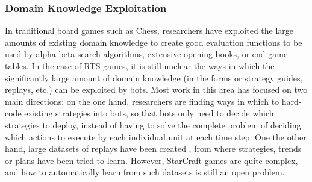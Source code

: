 \documentclass[journal]{IEEEtran}
\begin{document}
\subsubsection{Domain Knowledge Exploitation}
In traditional board games such as Chess, researchers have exploited the large amounts of existing domain knowledge to create good evaluation functions to be used by alpha-beta search algorithms, extensive opening books, or end-game tables. In the case of RTS games, it is still unclear the ways in which the significantly large amount of domain knowledge (in the forms or strategy guides, replays, etc.) can be exploited by bots. Most work in this area has focused on two main directions: on the one hand, researchers are finding ways in which to hard-code existing strategies into bots, so that bots only need to decide which strategies to deploy, instead of having to solve the complete problem of deciding which actions to execute by each individual unit at each time step. One the other hand, large datasets of replays have been created \cite{WeberCig09,synnaeve2012dataset}, from where strategies, trends or plans have been tried to learn. However, StarCraft games are quite complex, and how to automatically learn from such datasets is still an open problem.
\end{document}
